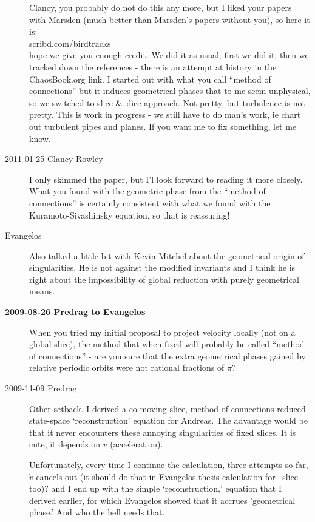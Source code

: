 \begin{description}
Clancy, you probably do not do this any more, but I liked your papers
with Marsden (much better than Marsden's papers without you), so here it
is:
\\
{scribd.com/birdtracks}
\\
hope we give you enough credit. We did it as usual; first we did it,
then we tracked down the references - there is an attempt at history
in the ChaosBook.org link. I started out with what you call ``method
of connections'' but it induces geometrical phases that to me seem
unphysical, so we switched to slice \&\ dice approach. Not pretty,
but turbulence is not pretty. This is work in progress - we still
have to do man's work, ie chart out turbulent pipes and planes. If
you want me to fix something, let me know.

\item[2011-01-25 Clancy Rowley]
I only skimmed the paper, but I'l look forward to reading it more
closely.  What you found with the geometric phase from the ``method
of connections'' is certainly consistent with what we found with the
Kuramoto-Sivashinsky equation, so that is reassuring!


\item[Evangelos]
Also talked a little bit with Kevin Mitchel about the geometrical origin
of singularities. He is not against the modified invariants and I think
he is right about the impossibility of global reduction with purely
geometrical means.

\item[\bf 2009-08-26 Predrag to Evangelos] When you tried my initial
proposal to project velocity locally (not on a global slice), the
method that when fixed will probably be called ``method of
connections'' - are you sure that the extra geometrical phases gained
by relative periodic orbits were not rational fractions of $\pi$?

\item[2009-11-09 Predrag]
Other setback. I derived a co-moving slice, method of
connections reduced state-space `reconstruction' equation for
Andreas. The advantage would be that it never encounters these
annoying singularities of fixed slices. It is cute, it depends
on $\dot{v}$ (acceleration).

Unfortunately, every time I continue the calculation, three
attempts so far, $\dot{v}$ cancels out (it should do that in
Evangelos thesis calculation for \reqv\ slice too)? and I end
up with the simple `reconstruction,' equation that I derived
earlier, for which Evangelos showed that it accrues
'geometrical phase.' And who the hell needs that.


\end{description}
